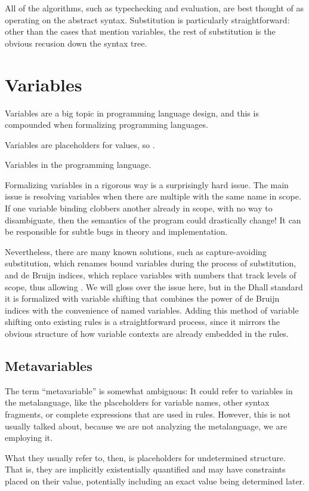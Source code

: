 \documentclass[11pt, twoside, reqno]{book}
\begin{document}
All of the algorithms, such as typechecking and evaluation, are best thought of as operating on the abstract syntax.
Substitution is particularly straightforward: other than the cases that mention variables, the rest of substitution is the obvious recusion down the syntax tree.

\section{Variables}

Variables are a big topic in programming language design, and this is compounded when formalizing programming languages.

Variables are placeholders for values, so .

Variables in the programming language.

Formalizing variables in a rigorous way is a surprisingly hard issue.
The main issue is resolving variables when there are multiple with the same name in scope.
If one variable binding clobbers another already in scope, with no way to disambiguate, then the semantics of the program could drastically change!
It can be responsible for subtle bugs in theory and implementation.

Nevertheless, there are many known solutions, such as capture-avoiding substitution, which renames bound variables during the process of substitution, and de Bruijn indices, which replace variables with numbers that track levels of scope, thus allowing .
We will gloss over the issue here, but in the Dhall standard it is formalized with variable shifting that combines the power of de Bruijn indices with the convenience of named variables.
Adding this method of variable shifting onto existing rules is a straightforward process, since it mirrors the obvious structure of how variable contexts are already embedded in the rules.

\subsection{Metavariables}

The term ``metavariable'' is somewhat ambiguous:
It could refer to variables in the metalanguage, like the placeholders for variable names, other syntax fragments, or complete expressions that are used in rules.
However, this is not usually talked about, because we are not analyzing the metalanguage, we are employing it.

What they usually refer to, then, is placeholders for undetermined structure.
That is, they are implicitly existentially quantified and may have constraints placed on their value, potentially including an exact value being determined later.
\end{document}
